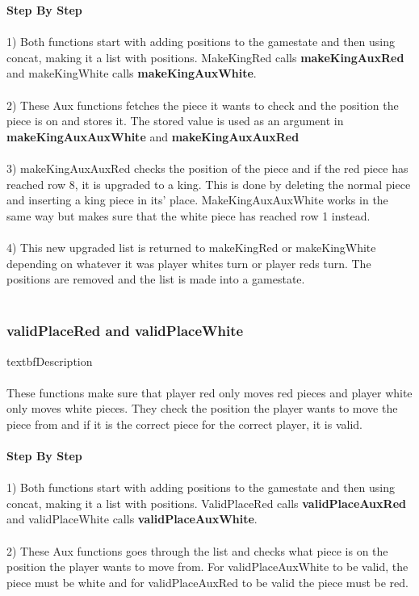 \documentclass[12pt,a4paper]{article}
\begin{document}
\textbf{Step By Step}\\\\
1) Both functions start with adding positions to the gamestate and then using concat, making it a list with positions. MakeKingRed calls {\textbf{\small{makeKingAuxRed}}} and makeKingWhite calls {\textbf{\small{makeKingAuxWhite}}}.\\\\
2) These Aux functions fetches the piece it wants to check and the position the piece is on and stores it. The stored value is used as an argument in {\textbf{\small{makeKingAuxAuxWhite}}} and 
{\textbf{\small{makeKingAuxAuxRed}}}\\\\
3) makeKingAuxAuxRed checks the position of the piece and if the red piece has reached row 8, it is upgraded to a king. This is done by deleting the normal piece and inserting a king piece in its' place. MakeKingAuxAuxWhite works in the same way but makes sure that the white piece has reached row 1 instead. \\\\
4) This new upgraded list is returned to makeKingRed or makeKingWhite depending on whatever it was player whites turn or player reds turn. The positions are removed and the list is made into a gamestate. 
\\\\
{\subsubsection{validPlaceRed and validPlaceWhite}}
textbf{Description}\\\\
These functions make sure that player red only moves red pieces and player white only moves white pieces. They check the position the player wants to move the piece from and if it is the correct piece for the correct player, it is valid.\\\\
\textbf{Step By Step}\\\\
1) Both functions start with adding positions to the gamestate and then using concat, making it a list with positions. ValidPlaceRed calls {\textbf{\small{validPlaceAuxRed}}} and validPlaceWhite calls {\textbf{\small{validPlaceAuxWhite}}}.\\\\
2) These Aux functions goes through the list and checks what piece is on the position the player wants to move from. For validPlaceAuxWhite to be valid, the piece must be white and for validPlaceAuxRed to be valid the piece must be red. 
\end{document}
